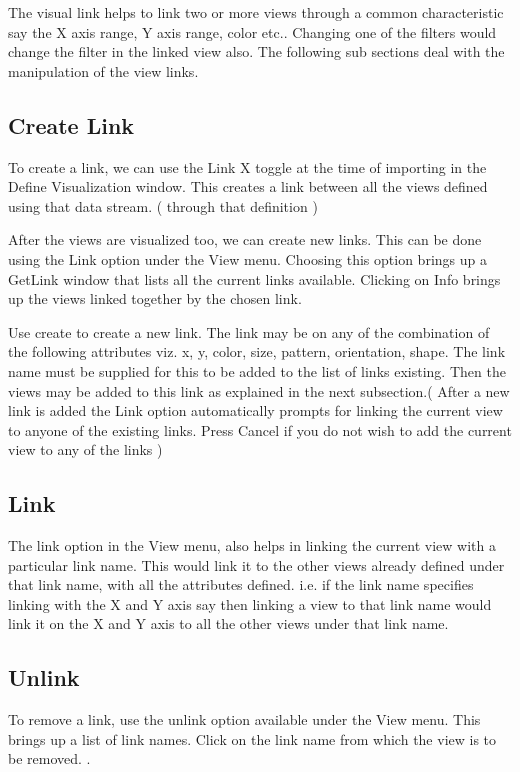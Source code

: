 The visual link helps to link two or more views through a common characteristic say the X axis range, Y axis range, color etc.. Changing one of the filters would change the filter in the linked view also. The following sub sections deal with the manipulation of the view links.

\subsection{Create Link}

To create a link, we can use the Link X toggle at the time of importing in the Define Visualization window. This creates a link between all the views defined using that data stream. ( through that definition ) 

After the views are visualized too, we can create new links. This can be done using the Link option under the View menu. Choosing this option brings up a GetLink window that lists all the current links available. Clicking on Info brings up the views linked together by the chosen link. 

Use create to create a new link. The link may be on any of the combination of the following attributes viz. x, y, color, size, pattern, orientation, shape. The link name must be supplied for this to be added to the list of links existing. Then the views may be added to this link as explained in the next subsection.( After a new link is added the Link option automatically prompts for linking the current view to anyone of the existing links. Press Cancel if you do not wish to add the current view to any of the links  ) 

\subsection{Link}

The link option in the View menu, also helps in linking the current view with a particular link name. This would link it to the other views already defined under that link name, with all the attributes defined. i.e. if the link name specifies linking with the X and Y axis say then linking a view to that link name would link it on the X and Y axis to all the other views under that link name. 

\subsection{Unlink}

To remove a link, use the unlink option available under the View menu. This brings up a list of link names. Click on the link name from which the view is to be removed.
.
